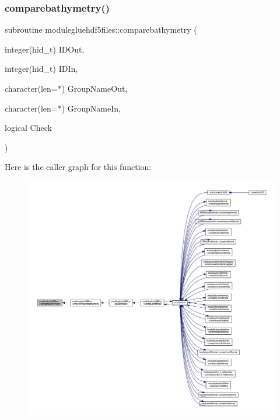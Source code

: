 \subsubsection{\texorpdfstring{comparebathymetry()}{comparebathymetry()}}
{\footnotesize\ttfamily subroutine modulegluehdf5files\+::comparebathymetry (\begin{DoxyParamCaption}\item[{integer(hid\+\_\+t)}]{I\+D\+Out,  }\item[{integer(hid\+\_\+t)}]{I\+D\+In,  }\item[{character(len=$\ast$)}]{Group\+Name\+Out,  }\item[{character(len=$\ast$)}]{Group\+Name\+In,  }\item[{logical}]{Check }\end{DoxyParamCaption})\hspace{0.3cm}{\ttfamily [private]}}

Here is the caller graph for this function\+:\nopagebreak
\begin{figure}[H]
\begin{center}
\leavevmode
\includegraphics[width=350pt]{namespacemodulegluehdf5files_affdb072b2fa667663ec2fcf107b11957_icgraph}
\end{center}
\end{figure}
\mbox{\label{namespacemodulegluehdf5files_aeacbdb79a83691a90c236da51ac23775}} 
